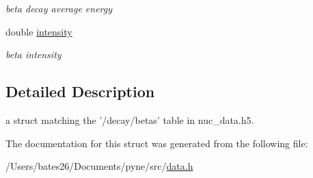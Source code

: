 \begin{DoxyCompactItemize}
\begin{DoxyCompactList}\small\item\em beta decay average energy \end{DoxyCompactList}\item 
\hypertarget{structpyne_1_1beta_a9c2cd5b0d491324940bdd68bde23113a}{double \hyperlink{structpyne_1_1beta_a9c2cd5b0d491324940bdd68bde23113a}{intensity}}\label{structpyne_1_1beta_a9c2cd5b0d491324940bdd68bde23113a}

\begin{DoxyCompactList}\small\item\em beta intensity \end{DoxyCompactList}\end{DoxyCompactItemize}


\subsection{Detailed Description}
a struct matching the '/decay/betas' table in nuc\+\_\+data.\+h5. 

The documentation for this struct was generated from the following file\+:\begin{DoxyCompactItemize}
\item 
/\+Users/bates26/\+Documents/pyne/src/\hyperlink{data_8h}{data.\+h}\end{DoxyCompactItemize}
